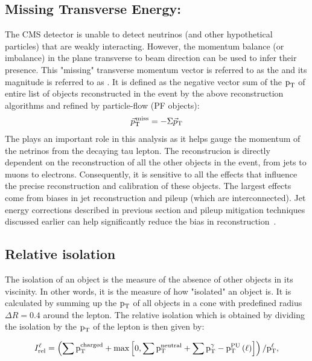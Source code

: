 \subsection{Missing Transverse Energy: \ptvecmiss} 
\label{mt_met_recon}
The CMS detector is unable to detect neutrinos (and other hypothetical particles) that are weakly interacting. However, the momentum balance (or imbalance) in the plane transverse to beam direction can be used to infer their presence. This "missing" transverse momentum vector is referred to as the \ptvecmiss and its magnitude is referred to as \ptmiss. It is defined as the negative vector sum of the $\text{p}_\text{T}$ of entire list of objects reconstructed in the event by the above reconstruction algorithms and refined by particle-flow (PF objects):
\begin{equation}
  {\vec p}_{\mathrm{T}}^{\kern1pt\text{miss}}=-\Sigma{\vec p}_{\mathrm{T}}
\end{equation}
The \ptvecmiss plays an important role in this analysis as it helps gauge the momentum of the netrinos from the decaying tau lepton. The \ptvecmiss reconstrucion is directly dependent on the reconstruction of all the other objects in the event, from jets to muons to electrons. Consequently, it is sensitive to all the effects that influence the precise reconstruction and calibration of these objects. The largest effects come from biases in jet reconstruction and pileup (which are interconnected). Jet energy corrections described in previous section and pileup mitigation techniques discussed earlier can help significantly reduce the bias in \ptvecmiss reconstruction~\cite{Sirunyan:2019kia}. 


\subsection{Relative isolation}
\label{isolation}
The isolation of an object is the measure of the absence of other objects in its viscinity. In other words, it is the measure of how "isolated" an object is. It is calculated by summing up the $\text{p}_\text{T}$ of all objects in a cone with predefined radius $\Delta R=0.4$ around the lepton. The relative isolation which is obtained by dividing the isolation by the $\text{p}_\text{T}$ of the lepton is then given by:

\begin{equation}
I_\text{rel}^{\ell} = \left( \sum  \text{p}_\text{T}^\text{charged} + \text{max}\left[ 0, \sum \text{p}_\text{T}^\text{neutral}
                                 +  \sum \text{p}_\text{T}^{\gamma} - \text{p}_\text{T}^\text{PU}\left(\ell\right)  \right] \right) /  \text{p}_\text{T}^{\ell},
\end{equation}


